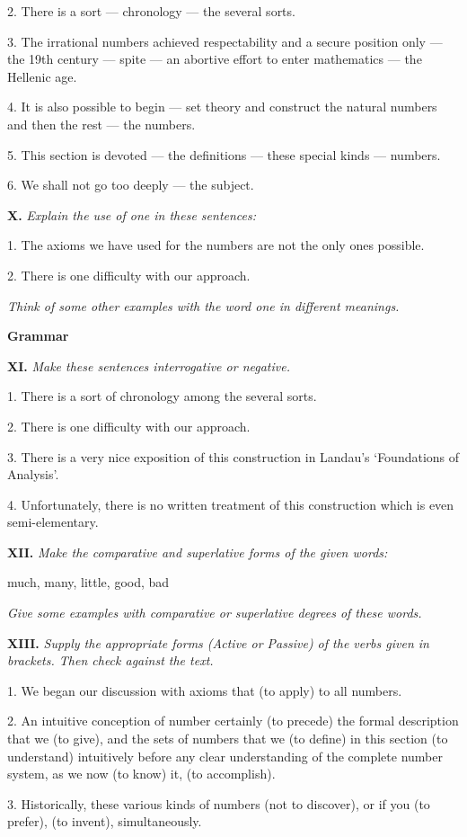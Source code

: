 \documentclass[a4paper]{article}
\newcommand{\ESect}[1]{\medskip\par{\large \textbf{#1}}\par}
\newcommand{\ETask}[2]{\medskip\par\textbf{#1.} \textit{#2}\par}
\begin{document}
2. There is a sort --- chronology --- the several sorts.

3. The irrational numbers achieved respectability and a secure position only --- the 19th century --- spite --- an abortive
effort to enter mathematics --- the Hellenic age.

4. It is also possible to begin --- set theory and construct the natural numbers and then the rest --- the numbers.

5. This section is devoted --- the definitions --- these special kinds --- numbers.

6. We shall not go too deeply --- the subject.

\ETask{X}{Explain the use of one in these sentences:}

1. The axioms we have used for the numbers are not the only ones possible.

2. There is one difficulty with our approach.

{\it Think of some other examples with the word one in different meanings.}

\ESect{Grammar}
\ETask{XI}{Make these sentences interrogative or negative.}
1. There is a sort of chronology among the several sorts.

2. There is one difficulty with our approach.

3. There is a very nice exposition of this construction in Landau's `Foundations of Analysis'.

4. Unfortunately, there is no written treatment of this construction which is even semi-elementary.

\ETask{XII}{Make the comparative and superlative forms of the given words:}
much, many, little, good, bad

{\it Give some examples with comparative or superlative degrees of these words.}

\ETask{XIII}{Supply the appropriate forms (Active or Passive) of the verbs given in brackets. Then check against the text.}

1. We began our discussion with axioms that (to apply) to all numbers.

2. An intuitive conception of number certainly (to precede) the formal description that we (to give), and the sets of
numbers that we (to define) in this section (to understand) intuitively before any clear understanding of the complete
number system, as we now (to know) it, (to accomplish).

3. Historically, these various kinds of numbers (not to discover), or if you (to prefer), (to invent), simultaneously.
\end{document}
